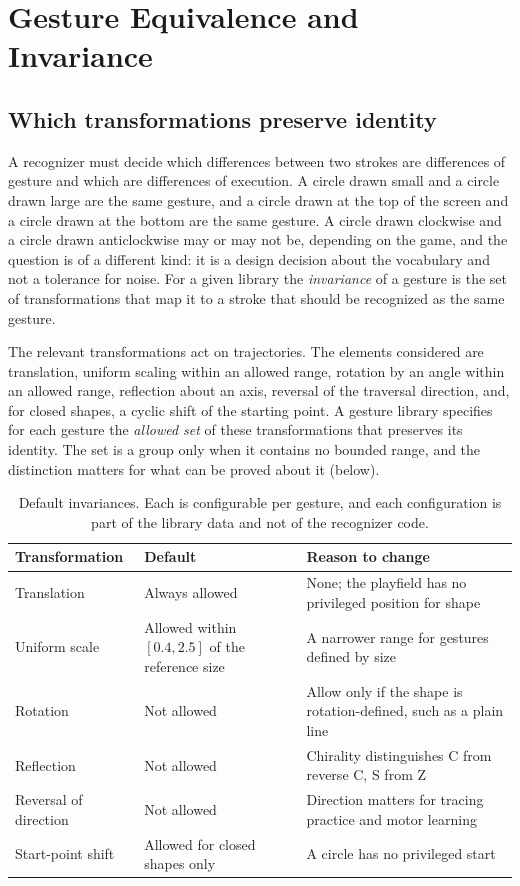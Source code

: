\chapter{Gesture Equivalence and Invariance}\label{ch:invariance}

\section{Which transformations preserve identity}

A recognizer must decide which differences between two strokes are differences of gesture and which are differences of execution. A circle drawn small and a circle drawn large are the same gesture, and a circle drawn at the top of the screen and a circle drawn at the bottom are the same gesture. A circle drawn clockwise and a circle drawn anticlockwise may or may not be, depending on the game, and the question is of a different kind: it is a design decision about the vocabulary and not a tolerance for noise. For a given library the \emph{invariance} of a gesture is the set of transformations that map it to a stroke that should be recognized as the same gesture.

The relevant transformations act on trajectories. The elements considered are translation, uniform scaling within an allowed range, rotation by an angle within an allowed range, reflection about an axis, reversal of the traversal direction, and, for closed shapes, a cyclic shift of the starting point. A gesture library specifies for each gesture the \emph{allowed set} of these transformations that preserves its identity. The set is a group only when it contains no bounded range, and the distinction matters for what can be proved about it (below).

\begin{table}[t]
\centering
\small
\begin{tabularx}{\textwidth}{@{}lXX@{}}
\toprule
Transformation & Default & Reason to change \\
\midrule
Translation & Always allowed & None; the playfield has no privileged position for shape \\
Uniform scale & Allowed within $[0.4,2.5]$ of the reference size & A narrower range for gestures defined by size \\
Rotation & Not allowed & Allow only if the shape is rotation-defined, such as a plain line \\
Reflection & Not allowed & Chirality distinguishes C from reverse C, S from Z \\
Reversal of direction & Not allowed & Direction matters for tracing practice and motor learning \\
Start-point shift & Allowed for closed shapes only & A circle has no privileged start \\
\bottomrule
\end{tabularx}
\caption{Default invariances. Each is configurable per gesture, and each configuration is part of the library data and not of the recognizer code.}
\label{tab:invariances}
\end{table}

